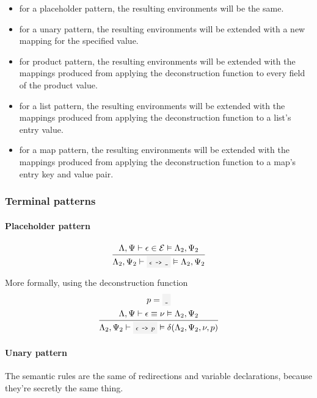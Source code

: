 \begin{itemize}
	\item for a placeholder pattern, the resulting environments will be the
		same.
	\item for a unary pattern, the resulting environments will be extended with
		a new mapping for the specified value.
	\item for product pattern, the resulting environments will be extended with
		the mappings produced from applying the deconstruction function to
		every field of the product value.
	\item for a list pattern, the resulting environments will be extended with
		the mappings produced from applying the deconstruction function to a
		list's entry value.
	\item for a map pattern, the resulting environments will be extended with
		the mappings produced from applying the deconstruction function to a
		map's entry key and value pair.
\end{itemize}

\clearpage

\subsubsection{Terminal patterns}

\paragraph{Placeholder pattern}
\[
	\oprule{
		\EnvLoc,\EnvStore \then \expr \in \Expr \Then \EnvLoc_2,\EnvStore_2
	}{
		\EnvLoc_2,\EnvStore_2 \then \code{$\expr$ -> \_} \Then \EnvLoc_2,\EnvStore_2
	}
\]

\vspace{\baselineskip}

More formally, using the deconstruction function
\[
	\oprule{
		\pattern = \code{\_} \\*
		\EnvLoc,\EnvStore \then \expr\eval\val \Then \EnvLoc_2,\EnvStore_2 \\*
	}{
		\EnvLoc_2,\EnvStore_2 \then \code{$\expr$ -> $\pattern$} \Then \decons(\EnvLoc_2,\EnvStore_2,\val,\pattern) \\*
	}
\]

\paragraph{Unary pattern} The semantic rules are the same of redirections and
variable declarations, because they're secretly the same thing.


